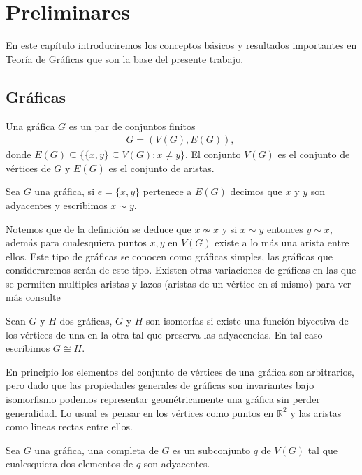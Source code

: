 \chapter{Preliminares}                %
En este capítulo introduciremos los conceptos básicos y resultados importantes en Teoría de Gráficas que son la base del presente trabajo.
\section{Gráficas}
\begin{Defi}[Gráfica]
Una gráfica $G$ es un par de conjuntos finitos 
\begin{eqnarray*}
G=(V(G),E(G)),\
\end{eqnarray*}
donde $E(G)\subseteq \{\{x,y\}\subseteq V(G):x \neq y\}$. El conjunto $V(G)$ es el conjunto de vértices de $G$ y $E(G)$ es el conjunto de aristas.
\end{Defi}
\begin{Defi}
Sea $G$ una gráfica, si $e =\{x,y\}$ pertenece a $E(G)$ decimos que $x$ y $y$ son adyacentes y escribimos $x \sim y$.
\end{Defi}
 Notemos que de la definición se deduce que $x\nsim x$ y si $x\sim y$ entonces $y\sim x$, además para cualesquiera puntos $x,y$ en $V(G)$ existe a lo más una arista entre ellos. Este tipo de gráficas se conocen como gráficas simples, las gráficas que consideraremos serán de este tipo.  
Existen otras variaciones de gráficas en las que se permiten multiples aristas y lazos (aristas de un vértice en sí mismo) para ver más consulte \cite{HF1969} 

\begin{Defi}[Isomorfismo]
Sean $G$ y $H$ dos gráficas, $G$ y $H$ son isomorfas si existe una función biyectiva de los vértices de una en la otra tal que preserva las adyacencias. En tal caso escribimos $G\cong H$.
\end{Defi}
En principio los elementos del conjunto de vértices de una gráfica son arbitrarios, pero dado que las propiedades generales de gráficas son invariantes bajo isomorfismo podemos representar geométricamente una gráfica sin perder generalidad. Lo usual es pensar en los vértices como puntos en $\mathbb{R}^2$ y las aristas como lineas rectas entre ellos.

\begin{Defi}[Completa]
Sea $G$ una gráfica, una completa de $G$ es un subconjunto $q$ de $V(G)$ tal que cualesquiera dos elementos de $q$ son adyacentes.
\end{Defi}

